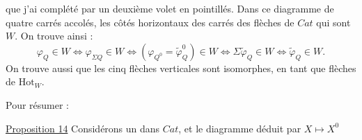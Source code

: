 que j'ai complété par un deuxième volet en pointillés. Dans ce diagramme de quatre carrés accolés, les côtés horizontaux des carrés  des flèches de $\mathit{Cat}$ qui sont  $W$. On trouve ainsi :
\[
\varphi_Q\in W\Longleftrightarrow\varphi_{\Sigma Q}\in W\Longleftrightarrow
(\varphi_{Q^0}=\widetilde\varphi_Q^0)\in W\Longleftrightarrow
\Sigma\widetilde\varphi_Q\in W\Longleftrightarrow\widetilde\varphi_Q\in W .
\]
On trouve aussi que les cinq flèches verticales sont isomorphes, en tant que flèches de $\mathrm{Hot}_W$.

Pour résumer :

\uline{Proposition 14} Considérons un   
dans $\mathit{Cat}$, et le diagramme  déduit par $X\mapsto X^0$

